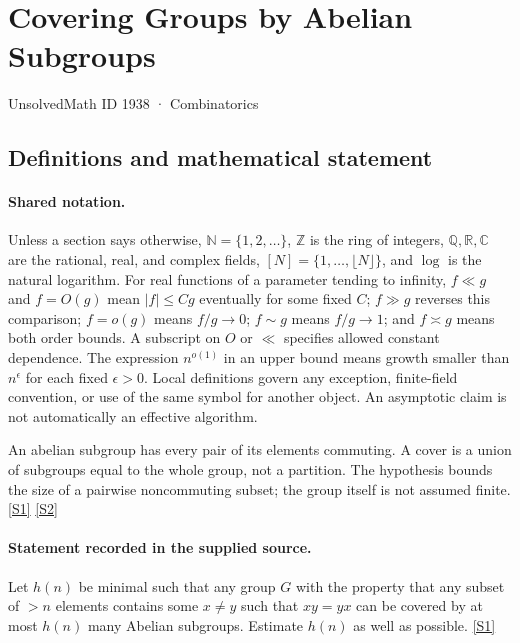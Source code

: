 \documentclass[11pt,a4paper]{article}
\newcommand{\N}{\mathbb{N}}
\newcommand{\Z}{\mathbb{Z}}
\newcommand{\Q}{\mathbb{Q}}
\newcommand{\R}{\mathbb{R}}
\newcommand{\C}{\mathbb{C}}
\newcommand{\sref}[2]{\hyperlink{source:#1:#2}{[S#2]}}
\begin{document}

\setcounter{section}{1937}

\section{Covering Groups by Abelian Subgroups}\label{1938}

{\small\sffamily UnsolvedMath ID 1938 · Combinatorics}

\subsection{Definitions and mathematical statement}

\paragraph{Shared notation.}Unless a section says otherwise, $\N=\{1,2,\ldots\}$,
$\Z$ is the ring of integers, $\Q,\R,\C$ are the rational, real, and complex
fields, $[N]=\{1,\ldots,\lfloor N\rfloor\}$, and $\log$ is the natural
logarithm. For real functions of a parameter tending to infinity,
$f\ll g$ and $f=O(g)$ mean $|f|\leq Cg$ eventually for some fixed $C$;
$f\gg g$ reverses this comparison; $f=o(g)$ means $f/g\to0$;
$f\sim g$ means $f/g\to1$; and $f\asymp g$ means both order bounds.
A subscript on $O$ or $\ll$ specifies allowed constant dependence.
The expression $n^{o(1)}$ in an upper bound means growth smaller than
$n^\epsilon$ for each fixed $\epsilon>0$. Local definitions govern any
exception, finite-field convention, or use of the same symbol for another
object. An asymptotic claim is not automatically an effective algorithm.



An abelian subgroup has every pair of its elements commuting. A cover is a union of subgroups equal to the whole group, not a partition. The hypothesis bounds the size of a pairwise noncommuting subset; the group itself is not assumed finite. \sref{1938}{1} \sref{1938}{2}

\paragraph{Statement recorded in the supplied source.}
Let $h(n)$ be minimal such that any group $G$ with the property that any subset of $>n$ elements contains some $x\neq y$ such that $xy=yx$ can be covered by at most $h(n)$ many Abelian subgroups.
Estimate $h(n)$ as well as possible. \sref{1938}{1}
\end{document}
